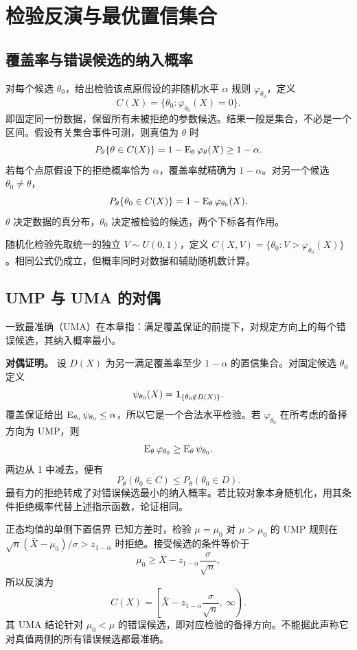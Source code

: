 \section{检验反演与最优置信集合}

\subsection{覆盖率与错误候选的纳入概率}

对每个候选 $\theta_0$，给出检验该点原假设的非随机水平 $\alpha$ 规则 $\varphi_{\theta_0}$，定义
\[
 C(X)=\{\theta_0:\varphi_{\theta_0}(X)=0\}.
\]
即固定同一份数据，保留所有未被拒绝的参数候选。结果一般是集合，不必是一个区间。假设有关集合事件可测，则真值为 $\theta$ 时
\[
 P_\theta\{\theta\in C(X)\}
 =1-\operatorname{E}_\theta\varphi_\theta(X)\ge1-\alpha.
\]
若每个点原假设下的拒绝概率恰为 $\alpha$，覆盖率就精确为 $1-\alpha$。对另一个候选 $\theta_0\ne\theta$，
\[
 P_\theta\{\theta_0\in C(X)\}
 =1-\operatorname{E}_\theta\varphi_{\theta_0}(X).
\]
$\theta$ 决定数据的真分布，$\theta_0$ 决定被检验的候选，两个下标各有作用。

随机化检验先取统一的独立 $V\sim U(0,1)$，定义
$C(X,V)=\{\theta_0:V>\varphi_{\theta_0}(X)\}$。相同公式仍成立，但概率同时对数据和辅助随机数计算。

\subsection{UMP 与 UMA 的对偶}

一致最准确（UMA）在本章指：满足覆盖保证的前提下，对规定方向上的每个错误候选，其纳入概率最小。

\textbf{对偶证明。}
设 $D(X)$ 为另一满足覆盖率至少 $1-\alpha$ 的置信集合。对固定候选 $\theta_0$ 定义
\[
 \psi_{\theta_0}(X)=\mathbf 1_{\{\theta_0\notin D(X)\}}.
\]
覆盖保证给出 $\operatorname{E}_{\theta_0}\psi_{\theta_0}\le\alpha$，所以它是一个合法水平检验。若 $\varphi_{\theta_0}$ 在所考虑的备择方向为 UMP，则
\[
 \operatorname{E}_\theta\varphi_{\theta_0}\ge\operatorname{E}_\theta\psi_{\theta_0}.
\]
两边从 1 中减去，便有
\[
 P_\theta(\theta_0\in C)\le P_\theta(\theta_0\in D).
\]
最有力的拒绝转成了对错误候选最小的纳入概率。若比较对象本身随机化，用其条件拒绝概率代替上述指示函数，论证相同。

\begin{examplebox}{正态均值的单侧下置信界}
已知方差时，检验 $\mu=\mu_0$ 对 $\mu>\mu_0$ 的 UMP 规则在
$\sqrt n(\bar X-\mu_0)/\sigma>z_{1-\alpha}$ 时拒绝。接受候选的条件等价于
\[
 \mu_0\ge\bar X-z_{1-\alpha}\frac\sigma{\sqrt n},
\]
所以反演为
\[
 C(X)=\left[\bar X-z_{1-\alpha}\frac\sigma{\sqrt n},\ \infty\right).
\]
其 UMA 结论针对 $\mu_0<\mu$ 的错误候选，即对应检验的备择方向。不能据此声称它对真值两侧的所有错误候选都最准确。
\end{examplebox}

